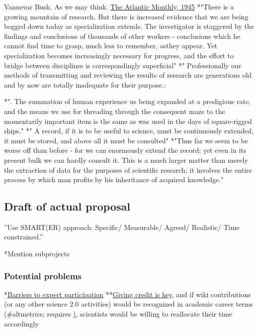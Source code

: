 \documentclass[final,authoryear,3p]{elsarticle-open-drafting}
\begin{document}
\begin{enumerate}
Vannevar Bush. As we may think. \href{http://web.mit.edu/STS.035/www/PDFs/think.pdf}{The Atlantic Monthly, 1945}
*"There is a growing mountain of research. But there is increased evidence that we are being bogged down today as specialization extends. The investigator is staggered by the findings and conclusions of thousands of other workers - conclusions which he cannot find time to grasp, much less to remember, asthey appear. Yet specialization becomes increasingly necessary for progress, and the effort to bridge between disciplines is correspondingly superficial"
*"
Professionally our methods of transmitting and reviewing the results of research are generations old and
by now are totally inadequate for their purpose.:

*". The summation of human experience us being expanded at a prodigious rate, and
the means we use for threading through the consequent maze to the momentarily important item is the
same as was used in the days of square-rigged ships."
*"
A record, if it is to be useful to science, must be continuously extended, it must be stored, and above all it
must be consulted"
*"Thus far we seem to be worse
off than before - for we can enormously extend the record; yet even in its present bulk we can hardly
consult it. This is a much larger matter than merely the extraction of data for the purposes of scientific
research; it involves the entire process by which man profits by his inheritance of acquired knowledge."


\subsection{Draft of actual proposal}
''Use SMART(ER) approach: Specific/ 
Measurable/ 
Agreed/ 
Realistic/ 
Time constrained.''

*Mention subprojects

\subsubsection{Potential problems}
*\href{http://wikimania2011.wikimedia.org/wiki/Submissions/Barriers_and_opportunities_for_expert_participation_in_Wikipedia:_Results_from_a_survey}{Barriers to expert participation}
**\href{http://cameronneylon.net/blog/michael-nielsen-the-credit-economy-and-open-science/}{Giving credit is key}, and if wiki contributions (or any other science 2.0 activities) would be recognized in academic career terms (\#altmetrics; requires \href{http://marciovm.com/michael-nielsen-on-the-future-of-science functional reputation systems}), scientists would be willing to reallocate their time accordingly



\end{enumerate}
\end{document}
